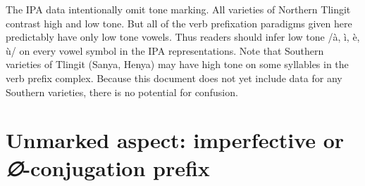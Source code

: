 \documentclass[12pt,letterpaper,landscape,oneside,article]{memoir}
\begin{document}
\begin{multicols}{2}
The IPA data intentionally omit tone marking.
All varieties of Northern Tlingit contrast high and low tone.
But all of the verb prefixation paradigms given here predictably have only low tone vowels.
Thus readers should infer low tone /à, ì, è, ù/ on every vowel symbol in the IPA representations.
Note that Southern varieties of Tlingit (Sanya, Henya) may have high tone on some syllables in the verb prefix complex.
Because this document does not yet include data for any Southern varieties, there is no potential for confusion.

\end{multicols}

\clearpage

\section{Unmarked aspect: imperfective or \textit{∅}-conjugation prefix}\label{sec:zero}
\end{document}
